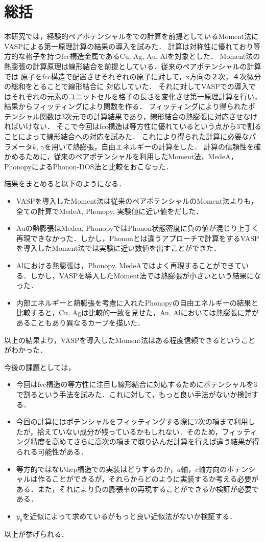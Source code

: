 \chapter{総括}
本研究では，経験的ペアポテンシャルをでの計算を前提としているMoment法にVASPによる第一原理計算の結果の導入を試みた．
計算は対称性に優れており等方的な格子を持つfcc構造金属であるCu, Ag, Au, Alを対象とした．
Moment法の熱膨張の計算原理は線形結合を前提としている．従来のペアポテンシャルの計算では
原子をfcc構造で配置させそれぞれの原子に対して，x方向の２次，４次微分の総和をとることで線形結合に
対応していた．
それに対してVASPでの導入ではそれぞれの元素のユニットセルを格子の長さを変化させ第一原理計算を行い，結果からフィッティングにより関数を作る．
フィッティングにより得られたポテンシャル関数は3次元での計算結果であり，線形結合の熱膨張に対応させなければいけない．
そこで今回はfcc構造は等方性に優れているという点から3で割ることによって線形結合への対応を試みた．
これにより得られた計算に必要なパラメータ$k$, $\gamma$を用いて熱膨張，自由エネルギーの計算をした．
計算の信頼性を確かめるために，従来のペアポテンシャルを利用したMoment法，MedeA，PhonopyによるPhonon-DOS法と比較をおこなった．

結果をまとめると以下のようになる．
\begin{itemize}
 \item VASPを導入したMoment法は従来のペアポテンシャルのMoment法よりも，全ての計算でMedeA, Phonopy, 実験値に近い値をだした．
 \item Auの熱膨張はMedea, PhonopyではPhonon状態密度に負の値が混じり上手く再現できなかった．しかし，Phononとは違うアプローチで計算をするVASPを導入したMoment法では実験に近い数値を出すことができた．
  \item Alにおける熱膨張は，Phonopy, MedeAではよく再現することができている．しかし，VASPを導入したMoment法では熱膨張が小さいという結果になった．
 \item 内部エネルギーと熱膨張を考慮に入れたPhonopyの自由エネルギーの結果と比較すると，Cu, Agは比較的一致を見せた，Au, Alにおいては熱膨張に差があることもあり異なるカーブを描いた．
\end{itemize}
以上の結果より，VASPを導入したMoment法はある程度信頼できるということがわかった．

今後の課題としては，

\begin{itemize}
 \item 今回はfcc構造の等方性に注目し線形結合に対応するためにポテンシャルを3で割るという手法を試みた．これに対して，もっと良い手法がないか検討する．
 \item 今回の計算にはポテンシャルをフィッティングする際に7次の項まで利用したが，拾えていない成分が残っているかもしれない．そのため，フィッティング精度を高めてさらに高次の項まで取り込んだ計算を行えば違う結果が得られる可能性がある．
  \item 等方的ではないhcp構造での実装はどうするのか，$a$軸，$c$軸方向のポテンシャルは作ることができるが，それらからどのように実装するか考える必要がある．また，それにより負の膨張率の再現することができるか検証が必要である．
  \item $y_0$を近似によって求めているがもっと良い近似法がないか検証する．
\end{itemize}
以上が挙げられる．



